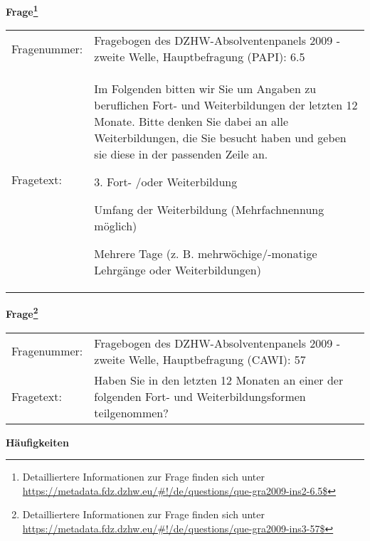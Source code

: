 				\vspace*{0.5cm}
                \noindent\textbf{Frage\footnote{Detailliertere Informationen zur Frage finden sich unter
		              \url{https://metadata.fdz.dzhw.eu/\#!/de/questions/que-gra2009-ins2-6.5$}}}\\
				\begin{tabularx}{\hsize}{@{}lX}
					Fragenummer: &
					  Fragebogen des DZHW-Absolventenpanels 2009 - zweite Welle, Hauptbefragung (PAPI):
					  6.5
 \\
					Fragetext: & Im Folgenden bitten wir Sie um Angaben zu beruflichen Fort- und Weiterbildungen der letzten 12 Monate. Bitte denken Sie dabei an alle Weiterbildungen, die Sie besucht haben und geben sie diese in der passenden Zeile an.\par  3. Fort- /oder Weiterbildung\par  Umfang der Weiterbildung (Mehrfachnennung möglich)\par  Mehrere Tage (z. B. mehrwöchige/-monatige Lehrgänge oder Weiterbildungen) \\
				\end{tabularx}
				\vspace*{0.5cm}
                \noindent\textbf{Frage\footnote{Detailliertere Informationen zur Frage finden sich unter
		              \url{https://metadata.fdz.dzhw.eu/\#!/de/questions/que-gra2009-ins3-57$}}}\\
				\begin{tabularx}{\hsize}{@{}lX}
					Fragenummer: &
					  Fragebogen des DZHW-Absolventenpanels 2009 - zweite Welle, Hauptbefragung (CAWI):
					  57
 \\
					Fragetext: & Haben Sie in den letzten 12 Monaten an einer der folgenden Fort- und Weiterbildungsformen teilgenommen? \\
				\end{tabularx}





        		\vspace*{0.5cm}
                \noindent\textbf{Häufigkeiten}


